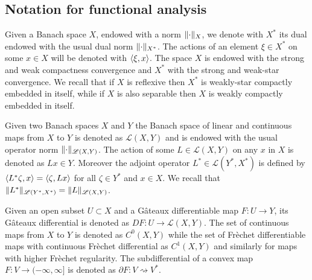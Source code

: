 \documentclass[a4paper,10pt,oneside]{amsbook}
\numberwithin{section}{chapter}
\numberwithin{equation}{chapter}
\theoremstyle{definition}
\DeclarePairedDelimiter{\norm}{\lVert}{\rVert}
\DeclarePairedDelimiter{\dual}{\langle}{\rangle}
\begin{document}
\subsection*{Notation for functional analysis}

Given a Banach space $X$, endowed with a norm $\norm{\cdot}_X$, we denote with $X^*$ its dual endowed with the usual dual norm $\norm{\cdot}_{X^*}$. The actions of an element $\xi\in X^*$ on some $x\in X$ will be denoted with $\dual{\xi,x}$. The space $X$ is endowed with the strong and weak compactness convergence and $X^*$ with the strong and weak-star convergence. We recall that if $X$ is reflexive then $X^*$ is weakly-star compactly embedded in itself, while if $X$ is also separable then $X$ is weakly compactly embedded in itself.

Given two Banach spaces $X$ and $Y$ the Banach space of linear and continuous maps from $X$ to $Y$ is denoted as $\mathscr{L}(X,Y)$ and is endowed with the usual operator norm $\norm{\cdot}_{\mathscr{L}(X,Y)}$. The action of some $L\in\mathscr{L}(X,Y)$ on any $x$ in $X$ is denoted as $Lx\in Y$. Moreover the adjoint operator $L^*\in\mathscr{L}(Y^*,X^*)$ is defined by $\dual{L^*\zeta,x}=\dual{\zeta,Lx}$ for all $\zeta\in Y^*$ and $x\in X$. We recall that $\norm{L^*}_{\mathscr{L}(Y^*,X^*)}=\norm{L}_{\mathscr{L}(X,Y)}$.

 Given an open subset $U\subset X$ and a G\^ateaux differentiable map $F\colon U\to Y$, its G\^ateaux differential is denoted as $DF\colon U\to\mathscr{L}(X,Y)$. The set of continuous maps from $X$ to $Y$ is denoted as $C^0(X,Y)$ while the set of Frèchet differentiable maps with continuous Frèchet differential as $C^1(X,Y)$ and similarly for maps with higher Frèchet regularity. The subdifferential of a convex map $F\colon V\to(-\infty,\infty]$ is denoted as $\partial F\colon V\rightsquigarrow V^*$.
\end{document}

